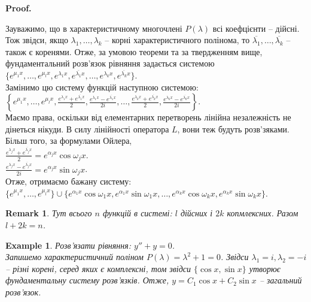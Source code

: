 \documentclass[a4paper, 10pt]{article}
\makeatletter
\def\qed{$\blacksquare$}
\theoremstyle{theoremdd}
\theoremstyle{theoremdd}
\theoremstyle{theoremdd}
\theoremstyle{theoremdd}
\newtheorem{example}[theorem]{Example}
\theoremstyle{theoremdd}
\theoremstyle{theoremdd}
\newtheorem{remark}[theorem]{Remark}
\theoremstyle{theoremdd}
\theoremstyle{theoremdd}
\renewenvironment{proof}[1][Proof.\\]{\par
\pushQED{\hfill \qed}%
\normalfont \topsep6\p@\@plus6\p@\relax
\trivlist
\item\relax
{\bfseries
#1\@addpunct{.}}\hspace\labelsep\ignorespaces
}{%
\popQED\endtrivlist\@endpefalse
}
\makeatother
\begin{document}
\begin{proof}
Зауважимо, що в характеристичному многочлені $P(\lambda)$ всі коефцієнти -- дійсні. Тож звідси, якщо $\lambda_1, \dots, \lambda_k$ -- корні характеристичного полінома, то $\overline{\lambda_1}, \dots, \overline{\lambda_k}$ -- також є коренями. Отже, за умовою теореми та за твердженням вище, фундаментальний розв'язок рівняння задається системою $\{e^{\mu_1 x}, \dots, e^{\mu_l x}, e^{\lambda_1 x}, e^{\overline{\lambda_1} x}, \dots, e^{\lambda_k x}, e^{\overline{\lambda_k} x}\}$.\\
Замінимо цю систему функцій наступною системою:\\
$\displaystyle \left\{e^{\mu_1 x}, \dots, e^{\mu_l x}, \frac{e^{\lambda_1 x} + e^{\overline{\lambda_1} x}}{2}, \frac{e^{\lambda_1 x} - e^{\overline{\lambda_1} x}}{2i}, \dots, \frac{e^{\lambda_k x} + e^{\overline{\lambda_k} x}}{2}, \frac{e^{\lambda_k x} - e^{\overline{\lambda_k} x}}{2i}\right\}$.\\
Маємо права, оскільки від елементарних перетворень лінійна незалежність не дінеться нікуди. В силу лінійності оператора $L$, вони теж будуть розв'зяками. Більш того, за формулами Ойлера,\\
$\displaystyle \frac{e^{\lambda_j x} + e^{\overline{\lambda_j} x}}{2} = e^{\alpha_j x} \cos \omega_j x$.\\
$\displaystyle \frac{e^{\lambda_j x} - e^{\overline{\lambda_j} x}}{2i} = e^{\alpha_j x} \sin \omega_j x$.\\
Отже, отримаємо бажану систему:\\
$\{e^{\mu_1 x}, \dots, e^{\mu_l x}\} \cup \{e^{\alpha_1 x} \cos \omega_1 x, e^{\alpha_1 x} \sin \omega_1 x, \dots, e^{\alpha_k x} \cos \omega_k x, e^{\alpha_k x} \sin \omega_k x\}$.
\end{proof}

\begin{remark}
 Тут всього $n$ функцій в системі: $l$ дійсних і $2k$  копмлексних. Разом $l + 2k = n$.
 \end{remark}
 
\begin{example}
Розв'язати рівняння: $y'' + y = 0$.\\
Запишемо характеристичний поліном $P(\lambda) = \lambda^2 + 1 = 0$. Звідси $\lambda_1 = i, \lambda_2 = -i$ -- різні корені, серед яких є комплексні, том звідси $\{\cos x, \sin x\}$ утворює фундаментальну систему розв'язків. Отже, $y = C_1 \cos x + C_2 \sin x$ -- загальний розв'язок.
\end{example}
\end{document}
